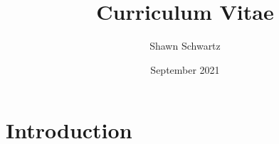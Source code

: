\documentclass{article}
\title{Curriculum Vitae}
\author{Shawn Schwartz}
\date{September 2021}
\begin{document}
\maketitle

\section{Introduction}
\end{document}
